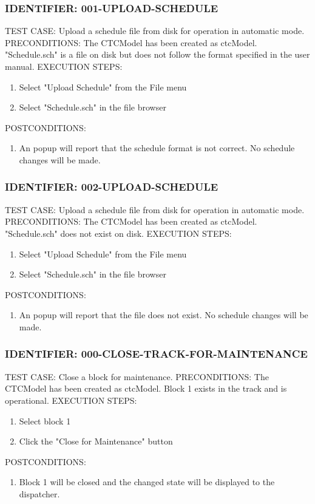 \documentclass{scrreprt}
\begin{document}
\subsubsection{IDENTIFIER: 001-UPLOAD-SCHEDULE}
TEST CASE: Upload a schedule file from disk for operation in automatic mode.
PRECONDITIONS: The CTCModel has been created as ctcModel. "Schedule.sch" is a file on disk but does not follow the format specified in the user manual.
EXECUTION STEPS:
\begin{enumerate}
	\item Select "Upload Schedule" from the File menu
	\item Select "Schedule.sch" in the file browser
\end{enumerate}
POSTCONDITIONS:
\begin{enumerate}
	\item An popup will report that the schedule format is not correct. No schedule changes will be made.
\end{enumerate}

\subsubsection{IDENTIFIER: 002-UPLOAD-SCHEDULE}
TEST CASE: Upload a schedule file from disk for operation in automatic mode.
PRECONDITIONS: The CTCModel has been created as ctcModel. "Schedule.sch" does not exist on disk.
EXECUTION STEPS:
\begin{enumerate}
	\item Select "Upload Schedule" from the File menu
	\item Select "Schedule.sch" in the file browser
\end{enumerate}
POSTCONDITIONS:
\begin{enumerate}
	\item An popup will report that the file does not exist. No schedule changes will be made.
\end{enumerate}

\subsubsection{IDENTIFIER: 000-CLOSE-TRACK-FOR-MAINTENANCE}
TEST CASE: Close a block for maintenance.
PRECONDITIONS: The CTCModel has been created as ctcModel. Block 1 exists in the track and is operational.
EXECUTION STEPS:
\begin{enumerate}
	\item Select block 1
	\item Click the "Close for Maintenance" button
\end{enumerate}
POSTCONDITIONS:
\begin{enumerate}
	\item Block 1 will be closed and the changed state will be displayed to the dispatcher.
\end{enumerate}
\end{document}
